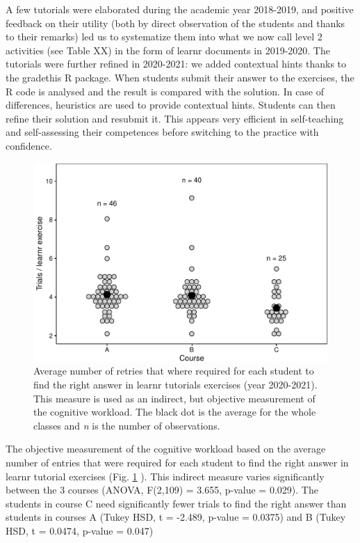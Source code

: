 \documentclass[
]{article}
\begin{document}
A few tutorials were elaborated during the academic year 2018-2019, and
positive feedback on their utility (both by direct observation of the
students and thanks to their remarks) led us to systematize them into
what we now call level 2 activities (see Table XX) in the form of learnr
documents in 2019-2020. The tutorials were further refined in 2020-2021:
we added contextual hints thanks to the gradethis R package. When
students submit their answer to the exercises, the R code is analysed
and the result is compared with the solution. In case of differences,
heuristics are used to provide contextual hints. Students can then
refine their solution and resubmit it. This appears very efficient in
self-teaching and self-assessing their competences before switching to
the practice with confidence.

\begin{figure}
\centering
\includegraphics{teaching_data_science_files/figure-latex/fig_learn_trials-1.pdf}
\caption{\label{fig:fig_learn_trials} Average number of retries that
where required for each student to find the right answer in learnr
tutorials exercises (year 2020-2021). This measure is used as an
indirect, but objective measurement of the cognitive workload. The black
dot is the average for the whole classes and \emph{n} is the number of
observations.}
\end{figure}

The objective measurement of the cognitive workload based on the average
number of entries that were required for each student to find the right
answer in learnr tutorial exercises (Fig. \ref {fig:fig_learn_trials} ).
This indirect measure varies significantly between the 3 courses (ANOVA,
F(2,109) = 3.655, p-value = 0.029). The students in course C need
significantly fewer trials to find the right answer than students in
courses A (Tukey HSD, t = -2.489, p-value = 0.0375) and B (Tukey HSD, t
= 0.0474, p-value = 0.047)
\end{document}
